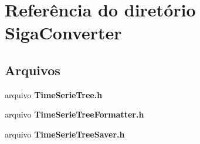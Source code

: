 \section{Referência do diretório Siga\+Converter}
\label{dir_57b680537f08d0af941f8dc4fe214d27}
\subsection*{Arquivos}
\begin{DoxyCompactItemize}
\item 
arquivo {\bf Time\+Serie\+Tree.\+h}
\item 
arquivo {\bf Time\+Serie\+Tree\+Formatter.\+h}
\item 
arquivo {\bf Time\+Serie\+Tree\+Saver.\+h}
\end{DoxyCompactItemize}
